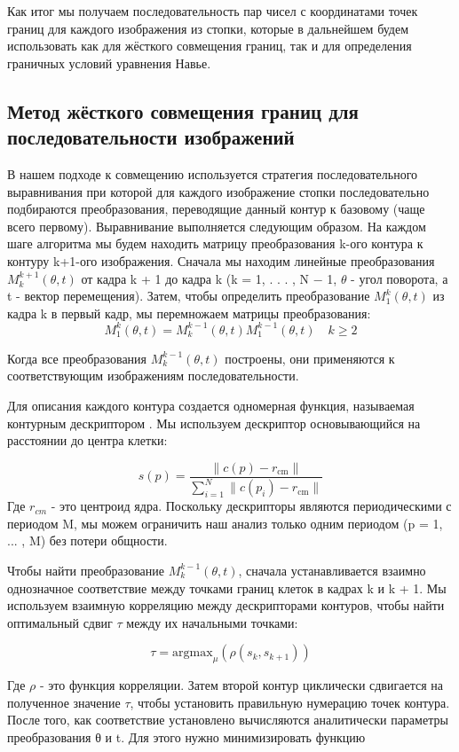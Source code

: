\documentclass[12pt]{article}
\begin{document}
Как итог мы получаем
последовательность пар чисел с координатами точек границ для каждого изображения из стопки, которые в дальнейшем будем использовать как для жёсткого
совмещения границ, так и для определения граничных условий уравнения Навье.


\subsection{Метод жёсткого совмещения границ для последовательности изображений}
В нашем подходе к совмещению используется стратегия последовательного выравнивания при которой
для каждого изображение стопки последовательно подбираются преобразования, переводящие данный контур к базовому (чаще всего первому).
Выравнивание выполняется следующим образом. На каждом шаге алгоритма мы будем находить матрицу преобразования k-ого контура к контуру k+1-ого  изображения.
Сначала мы находим линейные преобразования $M_k^{k+1}(\theta, t)$
от кадра k + 1 до кадра k (k =
1, . . . , N − 1, $\theta$ - угол поворота, а t - вектор перемещения).
Затем, чтобы определить преобразование $M_1^{k}(\theta, t)$ из кадра k в первый
кадр, мы перемножаем матрицы преобразования:
$$M_1^{k}(\theta, t) = M_{k}^{k-1}(\theta, t) M_1^{k-1}(\theta, t) \quad k\geq2 $$


Когда все преобразования $M_{k}^{k-1}(\theta, t)$ построены, они применяются к соответствующим изображениям
последовательности. 

Для описания каждого контура создается одномерная функция, называемая контурным дескриптором \cite{devylder2011}. Мы используем
дескриптор основывающийся на расстоянии до центра клетки:

$$ s(p) = \frac{\|c(p) - r_{\text{cm}}\|}{\sum_{i=1}^{N} \|c(p_i) - r_{\text{cm}}\|} $$ 
Где $r_{cm}$ - это центроид ядра. Поскольку дескрипторы являются
периодическими с периодом M, мы можем ограничить наш анализ только одним
периодом (p = 1, ... , M) без потери общности.


Чтобы найти преобразование $M_{k}^{k-1}(\theta, t)$, сначала устанавливается взаимно однозначное соответствие между точками границ клеток
в кадрах k и k + 1. Мы используем взаимную корреляцию между дескрипторами контуров, чтобы найти оптимальный сдвиг $\tau$ между их начальными точками:

$$ \tau = \text{argmax}_{\mu} \left( \rho(s_k, s_{k+1}) \right)$$

Где $\rho$ - это функция корреляции. Затем второй контур циклически сдвигается на полученное значение $\tau$, чтобы установить правильную нумерацию точек контура.
После того, как соответствие установлено вычисляются аналитически параметры преобразования θ и t\cite{annapurna2013}. Для этого нужно минимизировать функцию
\end{document}
